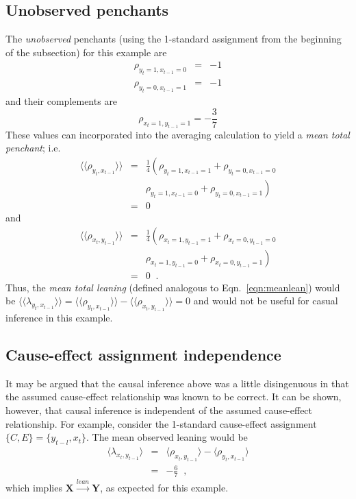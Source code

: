 \documentclass[twocolumn,aps,pre,groupedaddress]{revtex4-1}
\begin{document}
\subsection{Unobserved penchants}
The {\em unobserved} penchants (using the 1-standard assignment from the beginning of the subsection) for this example are
\begin{eqnarray}
\rho_{y_t=1,x_{t-1}=0} &=& -1\\
\rho_{y_t=0,x_{t-1}=1} &=& -1
\end{eqnarray}
and their complements are
\begin{equation}
\rho_{x_t=1,y_{t-1}=1}=-\frac{3}{7}
\end{equation}
These values can incorporated into the averaging calculation to yield a {\em mean total penchant}; i.e.\ 
\begin{eqnarray*}
\langle\langle \rho_{y_t,x_{t-1}} \rangle\rangle &=& \frac{1}{4}\left(\rho_{y_t=1,x_{t-1}=1} + \rho_{y_t=0,x_{t-1}=0}\right.\\
& &\left. \rho_{y_t=1,x_{t-1}=0} + \rho_{y_t=0,x_{t-1}=1}\right) \\
&=& 0
\end{eqnarray*}
and
\begin{eqnarray*}
\langle\langle \rho_{x_t,y_{t-1}} \rangle\rangle &=& \frac{1}{4}\left(\rho_{x_t=1,y_{t-1}=1} + \rho_{x_t=0,y_{t-1}=0}\right.\\
& &\left. \rho_{x_t=1,y_{t-1}=0} + \rho_{x_t=0,y_{t-1}=1}\right)\\
&=& 0\;\;.
\end{eqnarray*}
Thus, the {\em mean total leaning} (defined analogous to Eqn.\ \ref{eqn:meanlean}) would be $\langle\langle \lambda_{y_t,x_{t-1}} \rangle\rangle = \langle\langle \rho_{y_t,x_{t-1}} \rangle\rangle -  \langle\langle \rho_{x_t,y_{t-1}} \rangle\rangle = 0$ and would not be useful for casual inference in this example.

\subsection{Cause-effect assignment independence}
It may be argued that the causal inference above was a little disingenuous in that the assumed cause-effect relationship was known to be correct.  It can be shown, however, that causal inference is independent of the assumed cause-effect relationship.  For example, consider the 1-standard cause-effect assignment $\{C,E\}=\{y_{t-l},x_t\}$. The mean observed leaning would be
\begin{eqnarray}
\langle \lambda_{x_t,y_{t-1}} \rangle &=& \langle \rho_{x_t,y_{t-1}} \rangle - \langle \rho_{y_t,x_{t-1}} \rangle\\
&=& -\frac{6}{7}\;\;,
\end{eqnarray}
which implies $\mathbf{X}\xrightarrow{lean}\mathbf{Y}$, as expected for this example.
\end{document}
